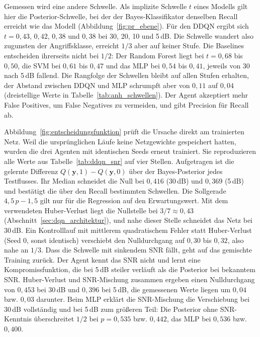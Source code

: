 Gemessen wird eine andere Schwelle. Als implizite Schwelle $t$ eines Modells gilt hier die Posterior-Schwelle, bei der der Bayes-Klassifikator denselben Recall erreicht wie das Modell (Abbildung~\ref{fig:pr_ebene}). Für den DDQN ergibt sich $t=0{,}43$, $0{,}42$, $0{,}38$ und $0{,}38$ bei 30, 20, 10 und 5\,dB. Die Schwelle wandert also zugunsten der Angriffsklasse, erreicht $1/3$ aber auf keiner Stufe. Die Baselines entscheiden ihrerseits nicht bei $1/2$: Der Random Forest liegt bei $t=0{,}68$ bis $0{,}50$, die SVM bei $0{,}61$ bis $0{,}47$ und das MLP bei $0{,}54$ bis $0{,}41$, jeweils von 30 nach 5\,dB fallend. Die Rangfolge der Schwellen bleibt auf allen Stufen erhalten, der Abstand zwischen DDQN und MLP schrumpft aber von $0{,}11$ auf $0{,}04$ (dreistellige Werte in Tabelle~\ref{tab:anh_schwellen}). Der Agent akzeptiert mehr False Positives, um False Negatives zu vermeiden, und gibt Precision für Recall ab.

Abbildung~\ref{fig:entscheidungsfunktion} prüft die Ursache direkt am trainierten Netz. Weil die ursprünglichen Läufe keine Netzgewichte gespeichert hatten, wurden die drei Agenten mit identischen Seeds erneut trainiert. Sie reproduzieren alle Werte aus Tabelle~\ref{tab:ddqn_snr} auf vier Stellen. Aufgetragen ist die gelernte Differenz $Q(\mathbf{y},1)-Q(\mathbf{y},0)$ über der Bayes-Posterior jedes Testflusses. Ihr Median schneidet die Null bei $0{,}416$ (30\,dB) und $0{,}369$ (5\,dB) und bestätigt die über den Recall bestimmten Schwellen. Die Sollgerade $4{,}5\,p-1{,}5$ gilt nur für die Regression auf den Erwartungswert. Mit dem verwendeten Huber-Verlust liegt die Nullstelle bei $3/7\approx0{,}43$ (Abschnitt~\ref{sec:dqn_architektur}), und nahe dieser Stelle schneidet das Netz bei 30\,dB. Ein Kontrolllauf mit mittlerem quadratischem Fehler statt Huber-Verlust (Seed 0, sonst identisch) verschiebt den Nulldurchgang auf $0{,}30$ bis $0{,}32$, also nahe an $1/3$. Dass die Schwelle mit sinkendem SNR fällt, geht auf das gemischte Training zurück. Der Agent kennt das SNR nicht und lernt eine Kompromissfunktion, die bei 5\,dB steiler verläuft als die Posterior bei bekanntem SNR. Huber-Verlust und SNR-Mischung zusammen ergeben einen Nulldurchgang von $0{,}453$ bei 30\,dB und $0{,}396$ bei 5\,dB, die gemessenen Werte liegen um $0{,}04$ bzw. $0{,}03$ darunter. Beim MLP erklärt die SNR-Mischung die Verschiebung bei 30\,dB vollständig und bei 5\,dB zum größeren Teil: Die Posterior ohne SNR-Kenntnis überschreitet $1/2$ bei $p=0{,}535$ bzw. $0{,}442$, das MLP bei $0{,}536$ bzw. $0{,}400$.

